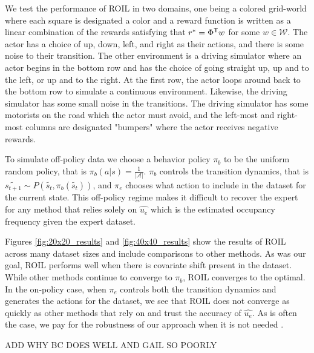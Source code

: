 \documentclass[10pt]{article}
\renewcommand{\cite}{\citep}
\begin{document}
We test the performance of ROIL in two domains, one being a colored grid-world where each square is designated a color and a reward function is written as a linear combination of the rewards satisfying that $r^* = \Phi^{\mathsf{T}} w$ for some $w \in \mathcal{W}$. 
The actor has a choice of up, down, left, and right as their actions, and there is some noise to their transition. 
The other environment is a driving simulator where an actor begins in the bottom row and has the choice of going straight up, up and to the left, or up and to the right. 
At the first row, the actor loops around back to the bottom row to simulate a continuous environment. Likewise, the driving simulator has some small noise in the transitions. The driving simulator has some motorists on the road which the actor must avoid, and the left-most and right-most columns are designated "bumpers" where the actor receives negative rewards.

To simulate off-policy data we choose a behavior policy $\pi_b$ to be the uniform random policy, that is $\pi_b(a|s) = \frac{1}{\lvert \mathcal{A} \rvert}$. $\pi_b$ controls the transition dynamics, that is $\tilde{s_{t+1}} \sim P(\tilde{s_t}, \pi_b(\tilde{s_t}))$, and $\pi_e$ chooses what action to include in the dataset for the current state. This off-policy regime makes it difficult to recover the expert for any method that relies solely on $\hat{u_e}$ which is the estimated occupancy frequency given the expert dataset.

Figures \ref{fig:20x20_results} and \ref{fig:40x40_results} show the results of ROIL across many dataset sizes and include comparisons to other methods. As was our goal, ROIL performs well when
there is covariate shift present in the dataset. While other methods continue to converge to $\pi_b$, ROIL converges to the optimal. In the on-policy case, when $\pi_e$ controls both the transition dynamics and generates the actions for the dataset, we see that ROIL does not converge as quickly as other methods that rely on and trust the accuracy of $\hat{u_e}$. As is often the case, we pay for the robustness of our approach when it is not needed \cite{}.

ADD WHY BC DOES WELL AND GAIL SO POORLY
\end{document}
